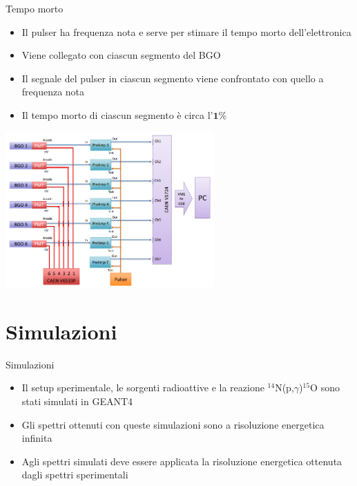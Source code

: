 \documentclass [xcolor=svgnames, 9pt] {beamer}
\begin{document}
\begin{frame}{Tempo morto}%
	\begin{itemize}
		\item Il pulser ha frequenza nota e serve per stimare il tempo morto dell'elettronica
		\item Viene collegato con ciascun segmento del BGO
		\item Il segnale del pulser in ciascun segmento viene confrontato con quello a frequenza nota
		\item Il tempo morto di ciascun segmento è circa l'$\mathbf{1\%}$
	\end{itemize}
	\centering
		\includegraphics[width=0.6\textwidth]{img/electronics.png}
\end{frame}











\section{Simulazioni}

\begin{frame}{Simulazioni}
	\begin{itemize}
		\item Il setup sperimentale, le sorgenti radioattive e la reazione $^{14}$N(p,$\gamma$)$^{15}$O sono stati simulati in GEANT4
		\item Gli spettri ottenuti con queste simulazioni sono a risoluzione energetica infinita
		\item Agli spettri simulati deve essere applicata la risoluzione energetica ottenuta dagli spettri sperimentali
	\end{itemize}
\end{frame}
\end{document}
